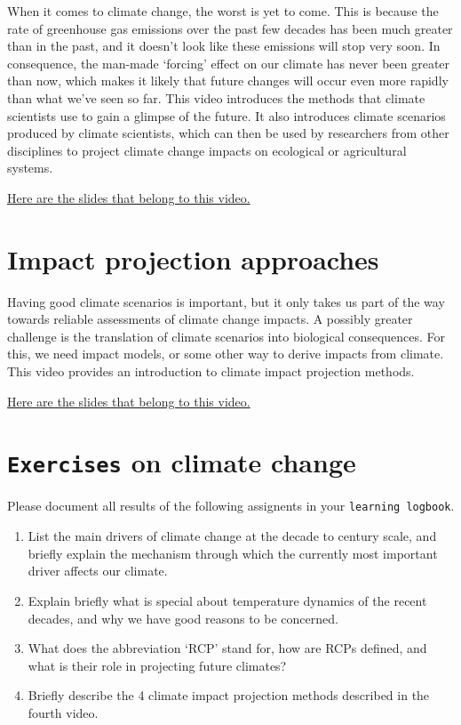 \documentclass[
]{book}
\begin{document}
When it comes to climate change, the worst is yet to come. This is because the rate of greenhouse gas emissions over the past few decades has been much greater than in the past, and it doesn't look like these emissions will stop very soon. In consequence, the man-made `forcing' effect on our climate has never been greater than now, which makes it likely that future changes will occur even more rapidly than what we've seen so far. This video introduces the methods that climate scientists use to gain a glimpse of the future. It also introduces climate scenarios produced by climate scientists, which can then be used by researchers from other disciplines to project climate change impacts on ecological or agricultural systems.

\href{https://uni-bonn.sciebo.de/s/69LVoQMPWXPFv5I}{Here are the slides that belong to this video.}

\hypertarget{impact-projection-approaches}{%
\section{Impact projection approaches}\label{impact-projection-approaches}}

Having good climate scenarios is important, but it only takes us part of the way towards reliable assessments of climate change impacts. A possibly greater challenge is the translation of climate scenarios into biological consequences. For this, we need impact models, or some other way to derive impacts from climate. This video provides an introduction to climate impact projection methods.

\href{https://uni-bonn.sciebo.de/s/IC87QhJb8hqnDhP}{Here are the slides that belong to this video.}

\hypertarget{exercises_climate_change}{%
\section*{\texorpdfstring{\texttt{Exercises} on climate change}{Exercises on climate change}}\label{exercises_climate_change}}

Please document all results of the following assignents in your \texttt{learning\ logbook}.

\begin{enumerate}
\def\labelenumi{\arabic{enumi})}
\item
  List the main drivers of climate change at the decade to century scale, and briefly explain the mechanism through which the currently most important driver affects our climate.
\item
  Explain briefly what is special about temperature dynamics of the recent decades, and why we have good reasons to be concerned.
\item
  What does the abbreviation `RCP' stand for, how are RCPs defined, and what is their role in projecting future climates?
\item
  Briefly describe the 4 climate impact projection methods described in the fourth video.
\end{enumerate}
\end{document}
